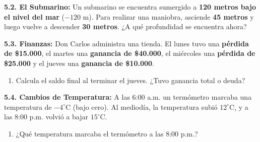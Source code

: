 \documentclass[11pt, letterpaper]{article}
\newif\ifshowanswers
\newcommand{\answer}[1]{
	\ifshowanswers
	\par\vspace{0.1cm}
	\begin{tcolorbox}[colback=blue!5!white, colframe=blue!60!white, arc=1mm, boxrule=0.5pt, title=\textbf{\footnotesize SOLUCIÓN PASO A PASO (DOCENTE)}]
		\color{blue!80!black}\footnotesize #1
	\end{tcolorbox}
	\par\vspace{0.1cm}
	\else
	\par\vspace{0.2cm}
	\fi
}
\begin{document}
	\answer{
		a) $-3 + 5 = +2 \rightarrow +2 - 4 = -2 \rightarrow -2 + 6 = +4$. Está en el \textbf{Piso 4}.
	}
	
	\vspace{0.2cm}
	
	\noindent \textbf{5.2. El Submarino:} Un submarino se encuentra sumergido a \textbf{120 metros bajo el nivel del mar} ($-120\text{ m}$). Para realizar una maniobra, asciende \textbf{45 metros} y luego vuelve a descender \textbf{30 metros}. ¿A qué profundidad se encuentra ahora?
	
	\answer{
		Expresión: $-120 + 45 - 30$. Operando: $-120 + 45 = -75 \rightarrow -75 - 30 = -105$. Se encuentra a \textbf{105 metros bajo el nivel del mar}.
	}
	
	\vspace{0.2cm}
	
	\noindent \textbf{5.3. Finanzas:} Don Carlos administra una tienda. El lunes tuvo una \textbf{pérdida de \$15.000}, el martes una \textbf{ganancia de \$40.000}, el miércoles una \textbf{pérdida de \$25.000} y el jueves una \textbf{ganancia de \$10.000}.
	\begin{enumerate}[label=\alph*), itemsep=0cm]
		\item Calcula el saldo final al terminar el jueves. ¿Tuvo ganancia total o deuda?
	\end{enumerate}
	
	\answer{
		a) $-15000 + 40000 - 25000 + 10000 = (+50000) - (+40000) = \mathbf{+10.000}$. Tuvo una \textbf{ganancia de \$10.000}.
	}
	
	\vspace{0.2cm}
	
	\noindent \textbf{5.4. Cambios de Temperatura:} A las 6:00 a.m. un termómetro marcaba una temperatura de \textbf{$-4^\circ\text{C}$} (bajo cero). Al mediodía, la temperatura subió \textbf{$12^\circ\text{C}$}, y a las 8:00 p.m. volvió a bajar \textbf{$15^\circ\text{C}$}.
	\begin{enumerate}[label=\alph*), itemsep=0cm]
		\item ¿Qué temperatura marcaba el termómetro a las 8:00 p.m.?
	\end{enumerate}
	
	\answer{
		a) $-4 + 12 = +8 \rightarrow +8 - 15 = -7$. La temperatura final era de \textbf{$-7^\circ\text{C}$}.
	}
	
\end{document}
